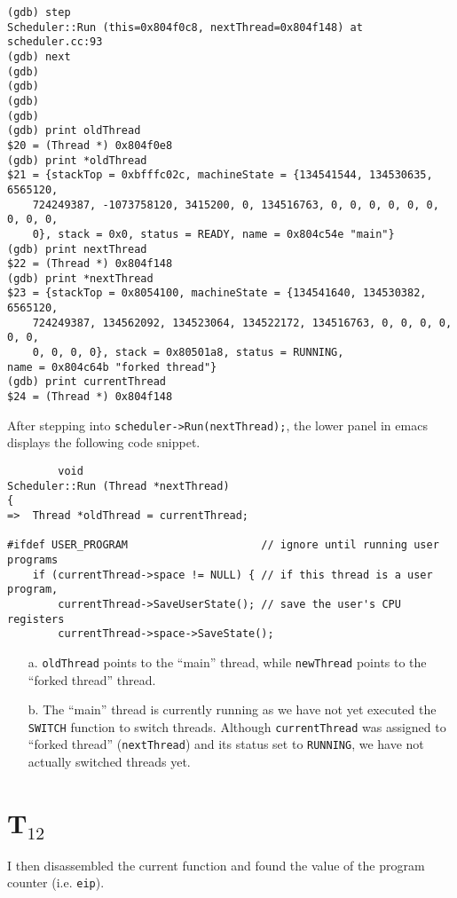 \documentclass[letterpaper, 10pt]{article}
\begin{document}
	\begin{verbatim}
(gdb) step
Scheduler::Run (this=0x804f0c8, nextThread=0x804f148) at scheduler.cc:93
(gdb) next
(gdb)
(gdb)
(gdb)
(gdb)
(gdb) print oldThread
$20 = (Thread *) 0x804f0e8
(gdb) print *oldThread
$21 = {stackTop = 0xbfffc02c, machineState = {134541544, 134530635, 6565120,
	724249387, -1073758120, 3415200, 0, 134516763, 0, 0, 0, 0, 0, 0, 0, 0, 0,
	0}, stack = 0x0, status = READY, name = 0x804c54e "main"}
(gdb) print nextThread
$22 = (Thread *) 0x804f148
(gdb) print *nextThread
$23 = {stackTop = 0x8054100, machineState = {134541640, 134530382, 6565120,
	724249387, 134562092, 134523064, 134522172, 134516763, 0, 0, 0, 0, 0, 0,
	0, 0, 0, 0}, stack = 0x80501a8, status = RUNNING,
name = 0x804c64b "forked thread"}
(gdb) print currentThread
$24 = (Thread *) 0x804f148
	\end{verbatim}

	After stepping into {\tt scheduler->Run(nextThread);}, the lower panel in emacs displays the following code snippet.

	\begin{verbatim}
		void
Scheduler::Run (Thread *nextThread)
{
=>  Thread *oldThread = currentThread;

#ifdef USER_PROGRAM                     // ignore until running user programs
    if (currentThread->space != NULL) { // if this thread is a user program,
        currentThread->SaveUserState(); // save the user's CPU registers
        currentThread->space->SaveState();
	\end{verbatim}

	\begin{itemize}
		\item[a.]{
		{\tt oldThread} points to the ``main'' thread, while {\tt newThread} points to the ``forked thread'' thread.
		}
		\item[b.]{
		The ``main'' thread is currently running as we have not yet executed the {\tt SWITCH} function to switch threads. Although {\tt currentThread} was assigned to ``forked thread'' ({\tt nextThread}) and its status set to {\tt RUNNING}, we have not actually switched threads yet.
		}
	\end{itemize}

	\section*{T$_{12}$}

	I then disassembled the current function and found the value of the program counter (i.e. {\tt eip}).
\end{document}

